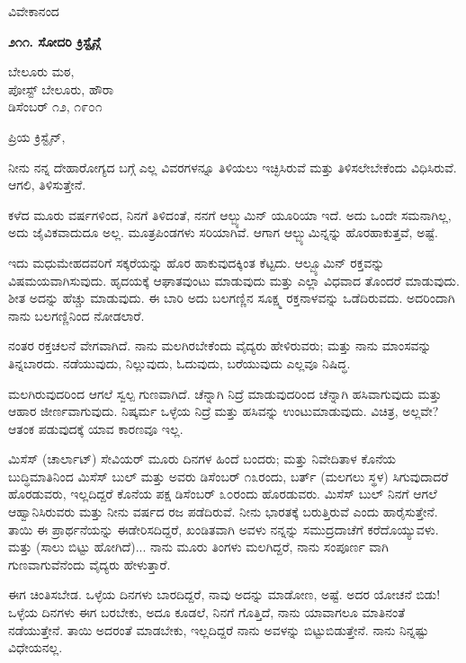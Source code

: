 \begin{flushright}
ವಿವೇಕಾನಂದ
\end{flushright}

\begin{center}
\textbf{೨೧೧. ಸೋದರಿ ಕ್ರಿಸ್ಟೈನ್ಗೆ}
\end{center}

\begin{flushright}
ಬೇಲೂರು ಮಠ,\\ಪೋಸ್ಟ್ ಬೇಲೂರು, ಹೌರಾ\\ಡಿಸೆಂಬರ್ ೧೨, ೧೯೦೧
\end{flushright}

ಪ್ರಿಯ ಕ್ರಿಸ್ಟೈನ್,

ನೀನು ನನ್ನ ದೇಹಾರೋಗ್ಯದ ಬಗ್ಗೆ ಎಲ್ಲ ವಿವರಗಳನ್ನೂ ತಿಳಿಯಲು ಇಚ್ಛಿಸಿರುವೆ ಮತ್ತು ತಿಳಿಸಲೇಬೇಕೆಂದು ವಿಧಿಸಿರುವೆ. ಆಗಲಿ, ತಿಳಿಸುತ್ತೇನೆ.

ಕಳೆದ ಮೂರು ವರ್ಷಗಳಿಂದ, ನಿನಗೆ ತಿಳಿದಂತೆ, ನನಗೆ ಆಲ್ಬ್ಯುಮಿನ್ ಯೂರಿಯಾ ಇದೆ. ಅದು ಒಂದೇ ಸಮನಾಗಿಲ್ಲ, ಅದು ಜೈವಿಕವಾದುದೂ ಅಲ್ಲ. ಮೂತ್ರಪಿಂಡಗಳು ಸರಿಯಾಗಿವೆ. ಆಗಾಗ ಆಲ್ಬ್ಯುಮಿನ್ನನ್ನು ಹೊರಹಾಕುತ್ತವೆ, ಅಷ್ಟೆ.

ಇದು ಮಧುಮೇಹದವರಿಗೆ ಸಕ್ಕರೆಯನ್ನು ಹೊರ ಹಾಕುವುದಕ್ಕಿಂತ ಕೆಟ್ಟದು. ಆಲ್ಬ್ಯೂಮಿನ್ ರಕ್ತವನ್ನು ವಿಷಮಯವಾಗಿಸುವುದು. ಹೃದಯಕ್ಕೆ ಆಘಾತವುಂಟು ಮಾಡುವುದು ಮತ್ತು ಎಲ್ಲಾ ವಿಧವಾದ ತೊಂದರೆ ಮಾಡುವುದು. ಶೀತ ಅದನ್ನು ಹೆಚ್ಚು ಮಾಡುವುದು. ಈ ಬಾರಿ ಅದು ಬಲಗಣ್ಣಿನ ಸೂಕ್ಷ್ಮ ರಕ್ತನಾಳವನ್ನು ಒಡೆದಿರುವದು. ಅದರಿಂದಾಗಿ ನಾನು ಬಲಗಣ್ಣಿನಿಂದ ನೋಡಲಾರೆ.

ನಂತರ ರಕ್ತಚಲನೆ ವೇಗವಾಗಿದೆ. ನಾನು ಮಲಗಿರಬೇಕೆಂದು ವೈದ್ಯರು ಹೇಳಿರುವರು; ಮತ್ತು ನಾನು ಮಾಂಸವನ್ನು ತಿನ್ನಬಾರದು. ನಡೆಯುವುದು, ನಿಲ್ಲುವುದು, ಓದುವುದು, ಬರೆಯುವುದು ಎಲ್ಲವೂ ನಿಷಿದ್ಧ.

ಮಲಗಿರುವುದರಿಂದ ಆಗಲೆ ಸ್ವಲ್ಪ ಗುಣವಾಗಿದೆ. ಚೆನ್ನಾಗಿ ನಿದ್ರೆ ಮಾಡುವುದರಿಂದ ಚೆನ್ನಾಗಿ ಹಸಿವಾಗುವುದು ಮತ್ತು ಆಹಾರ ಜೀರ್ಣವಾಗುವುದು. ನಿಷ್ಕರ್ಮ ಒಳ್ಳೆಯ ನಿದ್ರೆ ಮತ್ತು ಹಸಿವನ್ನು ಉಂಟುಮಾಡುವುದು. ವಿಚಿತ್ರ, ಅಲ್ಲವೇ? ಆತಂಕ ಪಡುವುದಕ್ಕೆ ಯಾವ ಕಾರಣವೂ ಇಲ್ಲ.

ಮಿಸೆಸ್ (ಚಾರ್ಲಾಟ್) ಸೇವಿಯರ್ ಮೂರು ದಿನಗಳ ಹಿಂದೆ ಬಂದರು; ಮತ್ತು ನಿವೇದಿತಾಳ ಕೊನೆಯ ಬುದ್ಧಿಮಾತಿನಿಂದ ಮಿಸೆಸ್ ಬುಲ್ ಮತ್ತು ಅವರು ಡಿಸೆಂಬರ್ ೧೩ರಂದು, ಬರ್ತ್ (ಮಲಗಲು ಸ್ಥಳ) ಸಿಗುವುದಾದರೆ ಹೊರಡುವರು, ಇಲ್ಲದಿದ್ದರೆ ಕೊನೆಯ ಪಕ್ಷ ಡಿಸೆಂಬರ್ ೩೦ರಂದು ಹೊರಡುವರು. ಮಿಸೆಸ್ ಬುಲ್ ನಿನಗೆ ಆಗಲೆ ಆಹ್ವಾನಿಸಿರುವರು ಮತ್ತು ನೀನು ವರ್ಷದ ರಜ ಪಡೆದಿರುವೆ. ನೀನು ಭಾರತಕ್ಕೆ ಬರುತ್ತಿರುವೆ ಎಂದು ಹಾರೈಸುತ್ತೇನೆ. ತಾಯಿ ಈ ಪ್ರಾರ್ಥನೆಯನ್ನು ಈಡೇರಿಸದಿದ್ದರೆ, ಖಂಡಿತವಾಗಿ ಅವಳು ನನ್ನನ್ನು ಸಮುದ್ರದಾಚೆಗೆ ಕರೆದೊಯ್ಯುವಳು. ಮತ್ತು (ಸಾಲು ಬಿಟ್ಟು ಹೋಗಿದೆ)... ನಾನು ಮೂರು ತಿಂಗಳು ಮಲಗಿದ್ದರೆ, ನಾನು ಸಂಪೂರ್ಣ ವಾಗಿ ಗುಣವಾಗುವೆನೆಂದು ವೈದ್ಯರು ಹೇಳುತ್ತಾರೆ.

ಈಗ ಚಿಂತಿಸಬೇಡ. ಒಳ್ಳೆಯ ದಿನಗಳು ಬಾರದಿದ್ದರೆ, ನಾವು ಅದನ್ನು ಮಾಡೋಣ, ಅಷ್ಟೆ. ಅದರ ಯೋಚನೆ ಬಿಡು! ಒಳ್ಳೆಯ ದಿನಗಳು ಈಗ ಬರಬೇಕು, ಅದೂ ಕೂಡಲೆ, ನಿನಗೆ ಗೊತ್ತಿದೆ, ನಾನು ಯಾವಾಗಲೂ ಮಾತಿನಂತೆ ನಡೆಯುತ್ತೇನೆ. ತಾಯಿ ಅದರಂತೆ ಮಾಡಬೇಕು, ಇಲ್ಲದಿದ್ದರೆ ನಾನು ಅವಳನ್ನು ಬಿಟ್ಟುಬಿಡುತ್ತೇನೆ. ನಾನು ನಿನ್ನಷ್ಟು ವಿಧೇಯನಲ್ಲ.

